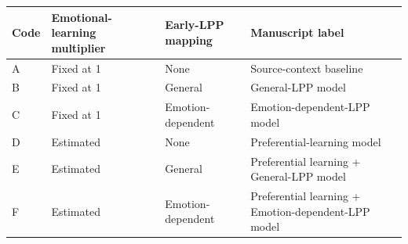 \documentclass[
  man,
  longtable,
  nolmodern,
  notxfonts,
  notimes,
  draftfirst,
  colorlinks=true,linkcolor=blue,citecolor=blue,urlcolor=blue]{apa7}
\begin{document}
\begin{table}

{\caption{{Key for the six primary model columns in
Table~\ref{tbl-model-parameters}.}{\label{tbl-primary-model-key}}}
\vspace{-20pt}}

\begin{longtable}[]{@{}
  >{\centering\arraybackslash}p{}
  >{\raggedright\arraybackslash}p{}
  >{\raggedright\arraybackslash}p{}
  >{\raggedright\arraybackslash}p{}@{}}
\toprule\noalign{}
\begin{minipage}[b]{\linewidth}\centering
Code
\end{minipage} & \begin{minipage}[b]{\linewidth}\raggedright
Emotional-learning multiplier
\end{minipage} & \begin{minipage}[b]{\linewidth}\raggedright
Early-LPP mapping
\end{minipage} & \begin{minipage}[b]{\linewidth}\raggedright
Manuscript label
\end{minipage} \\
\midrule\noalign{}
\endhead
\bottomrule\noalign{}
\endlastfoot
A & Fixed at 1 & None & Source-context baseline \\
B & Fixed at 1 & General & General-LPP model \\
C & Fixed at 1 & Emotion-dependent & Emotion-dependent-LPP model \\
D & Estimated & None & Preferential-learning model \\
E & Estimated & General & Preferential learning + General-LPP model \\
F & Estimated & Emotion-dependent & Preferential learning +
Emotion-dependent-LPP model \\
\end{longtable}

\end{table}
\end{document}
